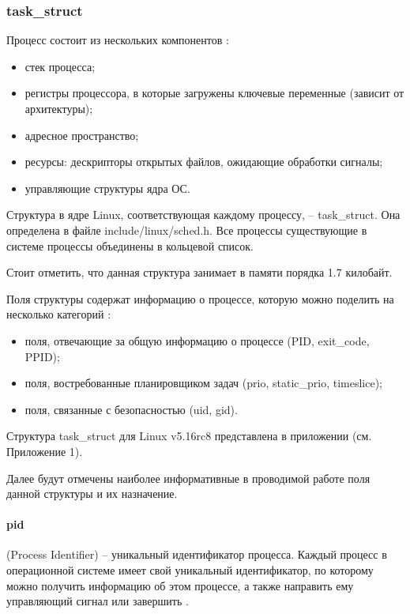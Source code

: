 \subsubsection{task\_struct}
Процесс состоит из нескольких компонентов \cite{linuxTasks}:
\begin{itemize}[leftmargin=1.6\parindent]
\item стек процесса;
\item регистры процессора, в которые загружены ключевые переменные (зависит от архитектуры);
\item адресное пространство;
\item ресурсы: дескрипторы открытых файлов, ожидающие обработки сигналы;
\item управляющие структуры ядра ОС.
\end{itemize}

Структура в ядре Linux, соответствующая каждому процессу, -- task\_struct. Она определена в файле include/linux/sched.h. Все процессы существующие в системе процессы объединены в кольцевой список. \cite{linuxTasks} 

Стоит отметить, что данная структура занимает в памяти порядка 1.7 килобайт.

Поля структуры содержат информацию о процессе, которую можно поделить на несколько категорий \cite{linuxTasks}:
\begin{itemize}[leftmargin=1.6\parindent]
\item поля, отвечающие за общую информацию о процессе (PID, exit\_code, PPID);
\item поля, востребованные планировщиком задач (prio, static\_prio, timeslice);
\item поля, связанные с безопасностью (uid, gid).
\end{itemize}

Структура task\_struct для Linux v5.16rc8 представлена в приложении (см. Приложение 1).

Далее будут отмечены наиболее информативные в проводимой работе поля данной структуры и их назначение.

\paragraph*{pid} (Process Identifier) -- уникальный идентификатор процесса. Каждый процесс в операционной системе имеет свой уникальный идентификатор, по которому можно получить информацию об этом процессе, а также направить ему управляющий сигнал или завершить \cite{losst}.

